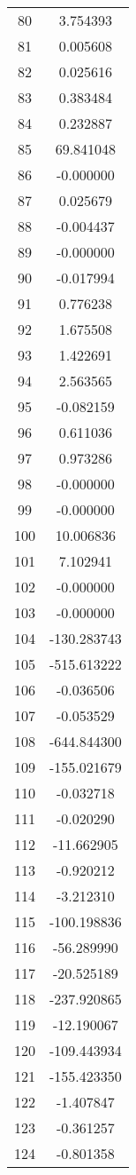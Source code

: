 \documentclass[12pt]{article}
\begin{document}
\begin{longtable}{@{}cc@{}}
80 & 3.754393 \\
81 & 0.005608 \\
82 & 0.025616 \\
83 & 0.383484 \\
84 & 0.232887 \\
85 & 69.841048 \\
86 & -0.000000 \\
87 & 0.025679 \\
88 & -0.004437 \\
89 & -0.000000 \\
90 & -0.017994 \\
91 & 0.776238 \\
92 & 1.675508 \\
93 & 1.422691 \\
94 & 2.563565 \\
95 & -0.082159 \\
96 & 0.611036 \\
97 & 0.973286 \\
98 & -0.000000 \\
99 & -0.000000 \\
100 & 10.006836 \\
101 & 7.102941 \\
102 & -0.000000 \\
103 & -0.000000 \\
104 & -130.283743 \\
105 & -515.613222 \\
106 & -0.036506 \\
107 & -0.053529 \\
108 & -644.844300 \\
109 & -155.021679 \\
110 & -0.032718 \\
111 & -0.020290 \\
112 & -11.662905 \\
113 & -0.920212 \\
114 & -3.212310 \\
115 & -100.198836 \\
116 & -56.289990 \\
117 & -20.525189 \\
118 & -237.920865 \\
119 & -12.190067 \\
120 & -109.443934 \\
121 & -155.423350 \\
122 & -1.407847 \\
123 & -0.361257 \\
124 & -0.801358 \\

\end{longtable}
\end{document}
